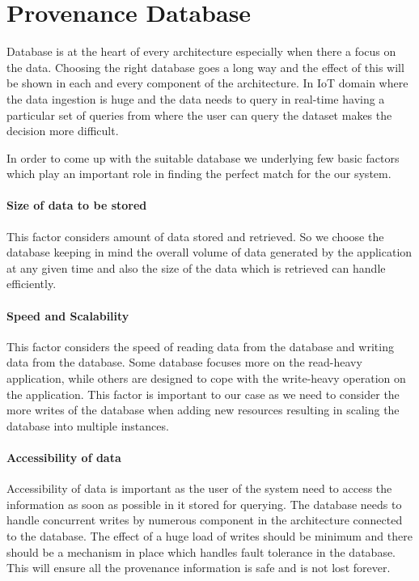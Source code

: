 \section{Provenance Database}

Database is at the heart of every architecture especially when there a focus on the data. Choosing the right database goes a long way and the effect of this will be shown in each and every component of the architecture. In IoT domain where the data ingestion is huge and the data needs to query in real-time having a particular set of queries from where the user can query the dataset makes the decision more difficult.

In order to come up with the suitable database we underlying few basic factors which play an important role in finding the perfect match for the our system.

\paragraph*{Size of data to be stored}
This factor considers amount of data stored and retrieved. So we choose the database keeping in mind the overall volume of data generated by the application at any given time and also the size of the data which is retrieved can handle efficiently.

\paragraph*{Speed and Scalability}
This factor considers the speed of reading data from the database and writing data from the database. Some database focuses more on the read-heavy application, while others are designed to cope with the write-heavy operation on the application. This factor is important to our case as we need to consider the more writes of the database when adding new resources resulting in scaling the database into multiple instances.

\paragraph*{Accessibility of data}
Accessibility of data is important as the user of the system need to access the information as soon as possible in it stored for querying. The database needs to handle concurrent writes by numerous component in the architecture connected to the database. The effect of a huge load of writes should be minimum and there should be a mechanism in place which handles fault tolerance in the database. This will ensure all the provenance information is safe and is not lost forever.

